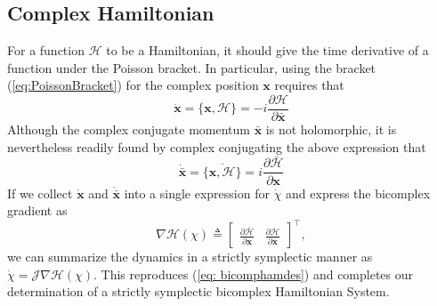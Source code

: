 \documentclass{article}
\begin{document}

 


\subsection{Complex Hamiltonian}
\label{sec: ham}

For a function $\mathcal{H}$ to be a Hamiltonian, it should give the time derivative of a function under the Poisson bracket.  
In particular, using the bracket (\ref{eq:PoissonBracket}) for the complex position $\textbf{x}$ requires that 
\begin{equation}
\label{eq:Poissonx}
    \dot{\textbf{x}}=\{\textbf{x},\mathcal{H}\}= -i\frac{\partial\mathcal{H}}{\partial \bar{\textbf{x}}}
\end{equation}
Although the complex conjugate momentum $\bar{\textbf{x}}$ is not holomorphic, it is nevertheless readily found by complex conjugating the above expression that
\begin{equation}
\label{eq:Poissonxbar}
    \dot{\bar{\textbf{x}}}=\overline{\{\textbf{x},\mathcal{H}\}}=i\frac{\partial \bar{\mathcal{H}}}{\partial \textbf{x}}
\end{equation}
If we collect $\dot{\textbf{x}}$ and $\dot{\bar{\textbf{x}}}$ into a single expression for $\dot{\chi}$ and
express the bicomplex gradient as 
\begin{equation}
\label{eq:BicomplexGradient}
    \nabla \mathcal{H}(\chi) \triangleq \begin{bmatrix}
    \frac{\partial {\bar{\mathcal{H}}}}{\partial \textbf{x}} &\frac{\partial {\mathcal{H}}}{\partial \bar{{\textbf{x}}}}
    \end{bmatrix}^\intercal,
\end{equation}
we can summarize the dynamics in a strictly symplectic manner as $\Dot{\chi}=\mathcal{J}\nabla\mathcal{H}(\chi)$.
 This reproduces (\ref{eq: bicomphamdes}) and completes our determination of a strictly symplectic bicomplex Hamiltonian System.
 
\end{document}

